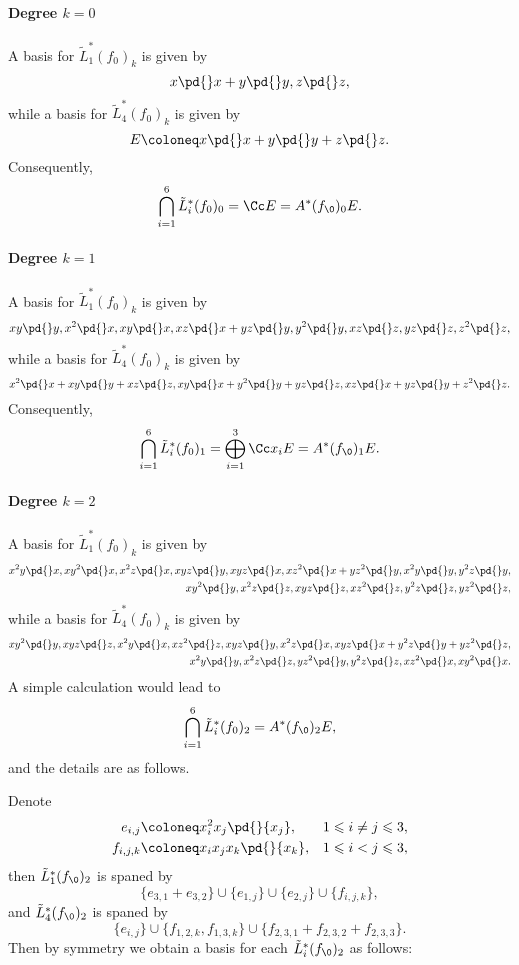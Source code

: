 \paragraph{Degree \texorpdfstring{$k=0$}{k=0}}
A basis for $\tilde L^*_1(f_0)_k$ is given by
\[x\pd{}x+y\pd{}y, z\pd{}z,\]
while a basis for $\tilde L^*_4(f_0)_k$ is given by
\[E\coloneq x \pd {} x + y \pd{} y + z\pd{} z.\]
Consequently,
\[\bigcap_{i=1}^6 \tilde L^*_i(f_0)_0 =\Cc E = A^*(f_\0)_0 E.\]

\paragraph{Degree \texorpdfstring{$k=1$}{k=1}}
A basis for $\tilde L^*_1(f_0)_k$ is given by
\[xy\pd{}y,
x^2\pd{}x ,
xy\pd{}x,
xz\pd{}x+yz\pd{}y,
y^2\pd{}y, 
xz\pd{}z,
yz\pd{}z,
z^2\pd{}z,\]
while a basis for $\tilde L^*_4(f_0)_k$ is given by
\[x^2 \pd{} x + xy \pd{} y + xz \pd{} z ,
xy\pd{} x+ y^2\pd{} y + yz \pd{} z,
xz \pd{} x + yz \pd{} y + z^2\pd{} z.\]
Consequently,
\[\bigcap_{i=1}^6 \tilde L^*_i(f_0)_1 =\bigoplus_{i=1}^3\Cc x_iE = A^*(f_\0)_1 E.\]

\paragraph{Degree \texorpdfstring{$k=2$}{k=2}}
A basis for $\tilde L^*_1(f_0)_k$ is given by
\begin{align*}
  x^2y\pd{}x,
  xy^2\pd{}x,
  x^2z\pd{}x,
  xyz\pd{}y,
  xyz\pd{}x,
  xz^2\pd{}x+yz^2\pd{}y,
  x^2y\pd{}y,
  y^2z\pd{}y,\\
  xy^2\pd{}y,
  x^2z\pd{}z,
  xyz\pd{}z,
  xz^2\pd{}z,
  y^2z\pd{}z,
  yz^2\pd{}z,
\end{align*}
while a basis for $\tilde L^*_4(f_0)_k$ is given by
\begin{align*}
  xy^2 \pd{} y ,
  xyz\pd{} z,
  x^2y\pd{} x ,
  xz^2 \pd{} z ,
  xyz\pd{} y,
  x^2z\pd{} x ,
  xyz\pd{}x+y^2z\pd{}y + y z^2\pd{} z,\\
  x^2 y \pd{} y  ,
  x^2 z \pd{} z ,
  yz^2\pd{}y,
  y^2z\pd{}z,
  xz^2\pd{}x,
  xy^2\pd{}x.
\end{align*}
A simple calculation would lead to 
\[\bigcap_{i=1}^6 \tilde L^*_i(f_0)_2= A^*(f_\0)_2 E,\]
and the details are as follows.

Denote
\begin{align*}
  e_{i,j}&\coloneq x_i^2 x_j \pd{} {x_j}, &1\leqslant i \not = j \leqslant 3,\\
  f_{i,j,k}&\coloneq x_i x_ jx_k\pd{}{x_k}, &1\leqslant i < j \leqslant 3,
\end{align*}
then $\tilde L_1^*(f_\0)_2$ is spaned by
\[\{e_{3,1}+e_{3,2}\} \cup \{e_{1,j}\}\cup \{ e_{2,j}  \} \cup\{f_{i,j,k}\},\]
and $\tilde L_4^*(f_\0)_2$ is spaned by
\[\{e_{i,j}\} \cup\{f_{1,2,k}, f_{1,3,k}\} \cup \{f_{2,3,1}+f_{2,3,2}+f_{2,3,3}\}.\]
Then by symmetry we obtain a basis for each $\tilde L^*_i(f_\0)_2$ as follows:

